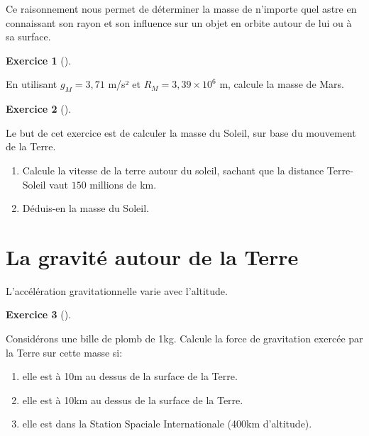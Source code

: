 \documentclass[
  letterpaper,
  DIV=11,
  numbers=noendperiod]{scrartcl}
\providecommand{\tightlist}{%
  \setlength{\itemsep}{0pt}\setlength{\parskip}{0pt}}\usepackage{longtable,booktabs,array}
\theoremstyle{definition}
\newtheorem{exercise}{Exercice}[section]
\theoremstyle{definition}
\theoremstyle{definition}
\theoremstyle{remark}
\begin{document}
Ce raisonnement nous permet de déterminer la masse de n'importe quel
astre en connaissant son rayon et son influence sur un objet en orbite
autour de lui ou à sa surface.

\begin{exercise}[]\protect\hypertarget{exr-masse-terre}{}\label{exr-masse-terre}

En utilisant \(g_M = 3,71\) m/s² et \(R_M = 3,39 \times 10^6\) m,
calcule la masse de Mars.

\end{exercise}

\begin{exercise}[]\protect\hypertarget{exr-masse-mars}{}\label{exr-masse-mars}

Le but de cet exercice est de calculer la masse du Soleil, sur base du
mouvement de la Terre.

\begin{enumerate}
\def\labelenumi{\arabic{enumi}.}
\tightlist
\item
  Calcule la vitesse de la terre autour du soleil, sachant que la
  distance Terre-Soleil vaut \(150\) millions de km.
\item
  Déduis-en la masse du Soleil.
\end{enumerate}

\end{exercise}

\section{La gravité autour de la
Terre}\label{la-gravituxe9-autour-de-la-terre}

L'accélération gravitationnelle varie avec l'altitude.

\begin{exercise}[]\protect\hypertarget{exr-alt}{}\label{exr-alt}

Considérons une bille de plomb de 1kg. Calcule la force de gravitation
exercée par la Terre sur cette masse si:

\begin{enumerate}
\def\labelenumi{\arabic{enumi}.}
\tightlist
\item
  elle est à 10m au dessus de la surface de la Terre.
\item
  elle est à 10km au dessus de la surface de la Terre.
\item
  elle est dans la Station Spaciale Internationale (400km d'altitude).
\end{enumerate}

\end{exercise}
\end{document}
